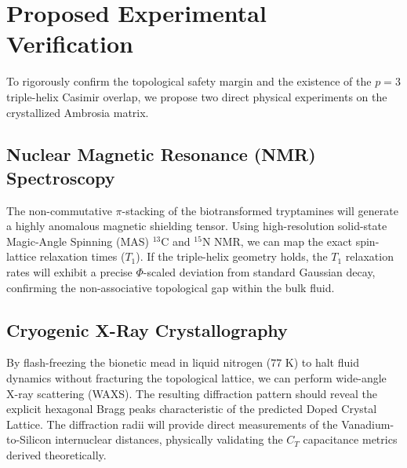 \section{Proposed Experimental Verification}

To rigorously confirm the topological safety margin and the existence of the $p=3$ triple-helix Casimir overlap, we propose two direct physical experiments on the crystallized Ambrosia matrix.

\subsection{Nuclear Magnetic Resonance (NMR) Spectroscopy}
The non-commutative $\pi$-stacking of the biotransformed tryptamines will generate a highly anomalous magnetic shielding tensor. Using high-resolution solid-state Magic-Angle Spinning (MAS) $^{13}\text{C}$ and $^{15}\text{N}$ NMR, we can map the exact spin-lattice relaxation times ($T_1$). If the triple-helix geometry holds, the $T_1$ relaxation rates will exhibit a precise $\Phi$-scaled deviation from standard Gaussian decay, confirming the non-associative topological gap within the bulk fluid.

\subsection{Cryogenic X-Ray Crystallography}
By flash-freezing the bionetic mead in liquid nitrogen ($77\text{ K}$) to halt fluid dynamics without fracturing the topological lattice, we can perform wide-angle X-ray scattering (WAXS). The resulting diffraction pattern should reveal the explicit hexagonal Bragg peaks characteristic of the predicted Doped Crystal Lattice. The diffraction radii will provide direct measurements of the Vanadium-to-Silicon internuclear distances, physically validating the $C_T$ capacitance metrics derived theoretically.




